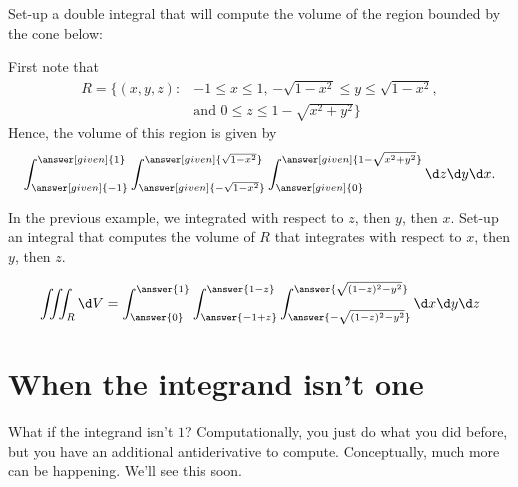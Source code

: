 \documentclass{ximera}
\begin{document}
\begin{example}
  Set-up a double integral that will compute the volume of the region
  bounded by the cone below:
  \begin{image}
  \end{image}
  \begin{explanation}
    First note that 
    \begin{align*}
      R=\{(x,y,z):&\text{$-1\leq x\leq 1$, $-\sqrt{1-x^2}\leq y\leq \sqrt{1-x^2}$}, \\
        &\text{and $0\leq z \leq 1-\sqrt{x^2+y^2}$}\}
    \end{align*}
    Hence, the volume of this region is given by
    \[
    \int_{\answer[given]{-1}}^{\answer[given]{1}}
    \int_{\answer[given]{-\sqrt{1-x^2}}}^{\answer[given]{\sqrt{1-x^2}}}
    \int_{\answer[given]{0}}^{\answer[given]{1-\sqrt{x^2+y^2}}}\d z \d y\d x.
    \]
    \end{explanation}
\end{example}

\begin{question}
  In the previous example, we integrated with respect to $z$, then
  $y$, then $x$. Set-up an integral that computes the volume of $R$
  that integrates with respect to $x$, then $y$, then $z$.
  \begin{prompt}
    \[
    \iiint_R \d V =
    \int_{\answer{0}}^{\answer{1}}
    \int_{\answer{-1+z}}^{\answer{1-z}}
    \int_{\answer{-\sqrt{(1-z)^2-y^2}}}^{\answer{\sqrt{(1-z)^2-y^2}}}
    \d x \d y \d z
    \]
  \end{prompt}
\end{question}

\section{When the integrand isn't one}

What if the integrand isn't $1$? Computationally, you just do what you
did before, but you have an additional antiderivative to
compute. Conceptually, much more can be happening. We'll see this soon.
\end{document}
